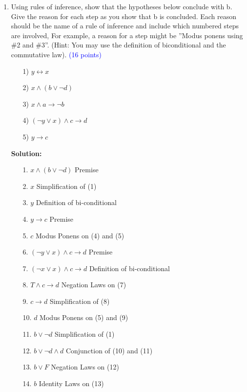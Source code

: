 \documentclass{article}
\newcommand{\pt}[1]{\textcolor{blue}{(#1 points)}}
\newenvironment{solution}
{
\par
\color{blue}
\textbf{Solution:}
}
{
\par
}
\begin{document}
\begin{enumerate}
\begin{solution}
    Therefore, we have shown through rules of inference that Akshay can solve the puzzle today. $\square$

    \end{solution}
    \newpage
    \item{Using rules of inference, show that the hypotheses below conclude with b. Give the reason for each step as you show that b is concluded. Each reason should be the name of a rule of inference and include which numbered steps are involved, For example, a reason for a step might be ”Modus ponens using \#2 and \#3”. (Hint: You may use the definition of biconditional and the commutative law).} \pt{16}
    
    \begin{enumerate}
        \item[1)] $y \leftrightarrow x$
        \item[2)] $x \land (b \lor \lnot d)$
        \item[3)] $x \land a \rightarrow \lnot b$
        \item[4)] $(\lnot y \lor x) \land c \rightarrow d$
        \item[5)] $y \rightarrow c$
    \end{enumerate}
    \color{blue}
        \begin{solution}
        \begin{enumerate}
            \item[1.] $x \land (b \lor \lnot d)$ \hfill Premise 
            \item[2.] $x$ \hfill Simplification of (1)
            \item[3.] $y$ \hfill Definition of bi-conditional
            \item[4.] $y \rightarrow c$ \hfill Premise
            \item[5.] $c$ \hfill Modus Ponens on (4) and (5)
            \item[6.] $(\lnot y \lor x) \land c \rightarrow d$ \hfill Premise
            \item[7.] $(\lnot x \lor x) \land c \rightarrow d$ \hfill Definition of bi-conditional
            \item[8.] $T \land c \rightarrow d$ \hfill Negation Laws on (7)
            \item[9.] $c \rightarrow d$ \hfill Simplification of (8)
            \item[10.] $d$ \hfill Modus Ponens on (5) and (9)
            \item[11.] $b \lor \lnot d$ \hfill Simplification of (1)
            \item[12.] $b \lor \lnot d \land d$ \hfill Conjunction of (10) and (11)
            \item[13.] $b \lor F$ \hfill Negation Laws on (12)
            \item[14.] $b$ \hfill Identity Laws on (13)
        \end{enumerate}
    \end{solution}
    

\end{enumerate}
\end{document}
